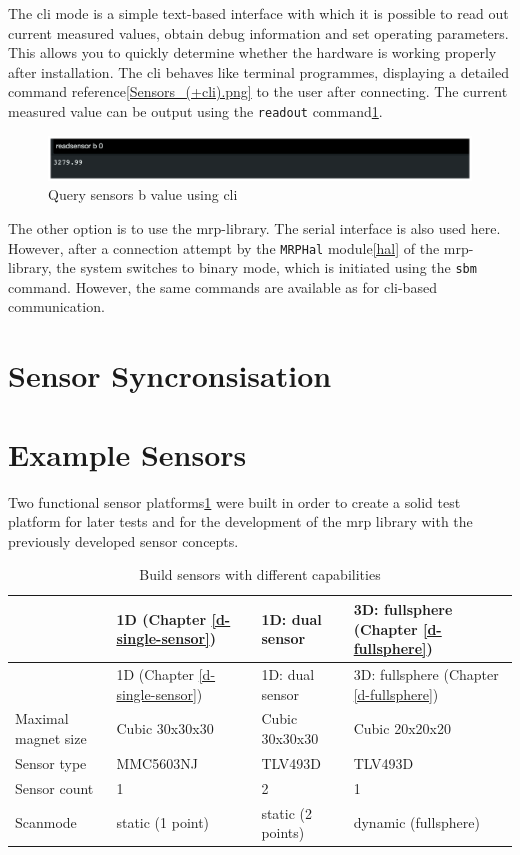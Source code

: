 The \gls{cli} mode is a simple text-based interface with which it is
possible to read out current measured values, obtain debug information
and set operating parameters. This allows you to quickly determine
whether the hardware is working properly after installation. The
\gls{cli} behaves like terminal programmes, displaying a detailed
command reference\ref{Sensors_(+cli).png} to the user after connecting.
The current measured value can be output using the
\passthrough{\lstinline!readout!}
command\ref{Query_sensors_b_value_using_(+cli).png}.

\begin{figure}
\centering
\includegraphics{./generated_images/border_Query_sensors_b_value_using_(+cli).png}
\caption{Query sensors b value using \gls{cli}
\label{Query_sensors_b_value_using_(+cli).png}}
\end{figure}

The other option is to use the \gls{mrp}-library. The serial interface
is also used here. However, after a connection attempt by the
\passthrough{\lstinline!MRPHal!} module\ref{hal} of the
\gls{mrp}-library, the system switches to binary mode, which is
initiated using the \passthrough{\lstinline!sbm!} command. However, the
same commands are available as for \gls{cli}-based communication.

\hypertarget{sensor-syncronsisation}{%
\section{Sensor Syncronsisation}\label{sensor-syncronsisation}}

\hypertarget{example-sensors}{%
\section{Example Sensors}\label{example-sensors}}

Two functional sensor
platforms\ref{Build_sensors_with_different_capabilities.csv} were built
in order to create a solid test platform for later tests and for the
development of the \gls{mrp} library with the previously developed
sensor concepts.

\begin{longtable}[]{@{}llll@{}}
\caption{Build sensors with different capabilities
\label{Build_sensors_with_different_capabilities.csv}}\tabularnewline
\toprule
& 1D (Chapter \ref{d-single-sensor}) & 1D: dual sensor & 3D: fullsphere
(Chapter \ref{d-fullsphere})\tabularnewline
\midrule
\endfirsthead
\toprule
& 1D (Chapter \ref{d-single-sensor}) & 1D: dual sensor & 3D: fullsphere
(Chapter \ref{d-fullsphere})\tabularnewline
\midrule
\endhead
Maximal magnet size & Cubic 30x30x30 & Cubic 30x30x30 & Cubic
20x20x20\tabularnewline
Sensor type & MMC5603NJ & TLV493D & TLV493D\tabularnewline
Sensor count & 1 & 2 & 1\tabularnewline
Scanmode & static (1 point) & static (2 points) & dynamic
(fullsphere)\tabularnewline
\bottomrule
\end{longtable}

